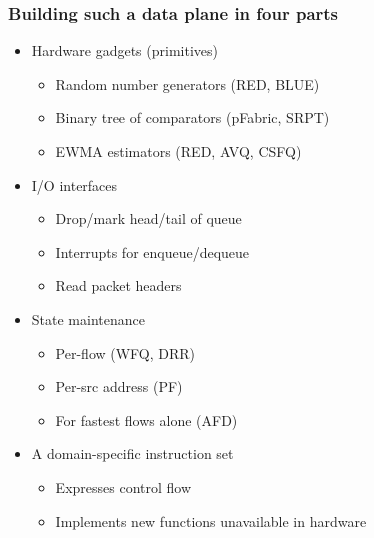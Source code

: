 \begin{frame}[plain]
\frametitle{Building such a data plane in four parts}
\begin{itemize}
\item Hardware gadgets (primitives)
      \begin{itemize}
      \item Random number generators (RED, BLUE)
      \item Binary tree of comparators (pFabric, SRPT)
      \item EWMA estimators (RED, AVQ, CSFQ)
      \end{itemize}

\item I/O interfaces
      \begin{itemize}
      \item Drop/mark head/tail of queue
      \item Interrupts for enqueue/dequeue
      \item Read packet headers
      \end{itemize}

\item State maintenance
      \begin{itemize}
      \item Per-flow (WFQ, DRR)
      \item Per-src address (PF)
      \item For fastest flows alone (AFD)
      \end{itemize}

\item A domain-specific instruction set
      \begin{itemize}
      \item Expresses control flow
      \item Implements new functions unavailable in hardware
      \end{itemize}
\end{itemize}
\end{frame}

